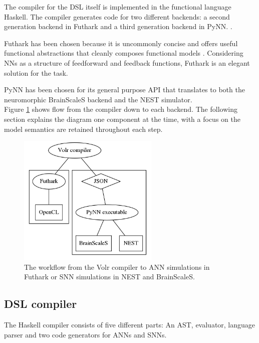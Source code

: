 The compiler for the \gls{DSL} itself is implemented in the functional language
Haskell.
The compiler generates code for two different backends: a second generation
backend in Futhark  and a third generation backend in PyNN.
.

Futhark has been chosen because it is uncommonly concise and offers
useful functional abstractions that cleanly composes functional
models \cite{Henriksen2017}.
Considering \gls{NN}s as a structure of feedforward and feedback functions,
Futhark is an elegant solution for the task.

PyNN has been chosen for its general purpose API that translates to both the
neuromorphic BrainScaleS  backend and the NEST 
 simulator.
\\[0.2cm]
Figure \ref{fig:volr-architecture} shows flow from the compiler
down to each backend.
The following section explains the diagram one component at the time, 
with a focus on the model semantics are 
retained throughout each step.

\begin{figure}
  \centering
  \includegraphics[width=0.6\textwidth]{images/volr-architecture.png}
  \caption{The workflow from the Volr compiler to 
    \gls{ANN} simulations in Futhark or \gls{SNN} simulations in \gls{NEST} and
    \gls{BrainScaleS}.
  }
  \label{fig:volr-architecture}
\end{figure}

\subsection{DSL compiler}
The Haskell compiler consists of five different parts:
An \gls{AST}, evaluator, language parser and two
code generators for \gls{ANN}s and \gls{SNN}s.

